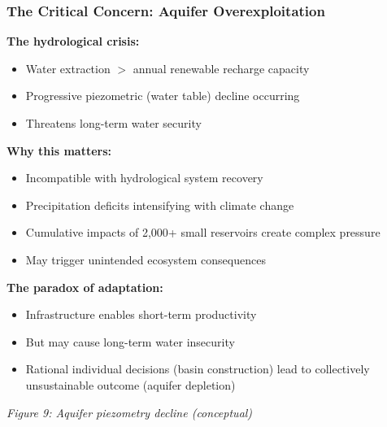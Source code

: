 \documentclass{beamer}
\begin{document}
\begin{frame}
\frametitle{The Critical Concern: Aquifer Overexploitation}

\textbf{The hydrological crisis:}
\begin{itemize}
  \item Water extraction $>$ annual renewable recharge capacity
  \item Progressive piezometric (water table) decline occurring
  \item Threatens long-term water security
\end{itemize}

\textbf{Why this matters:}
\begin{itemize}
  \item Incompatible with hydrological system recovery
  \item Precipitation deficits intensifying with climate change
  \item Cumulative impacts of 2,000+ small reservoirs create complex pressure
  \item May trigger unintended ecosystem consequences
\end{itemize}

\textbf{The paradox of adaptation:}
\begin{itemize}
  \item Infrastructure enables short-term productivity
  \item But may cause long-term water insecurity
  \item Rational individual decisions (basin construction) lead to collectively unsustainable outcome (aquifer depletion)
\end{itemize}

\begin{center}
  \small{\textit{Figure 9: Aquifer piezometry decline (conceptual)}}
\end{center}
\end{frame}
\end{document}
